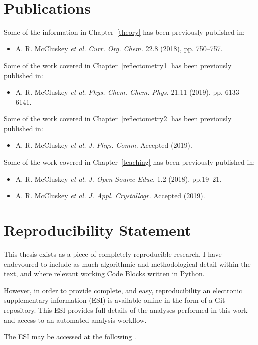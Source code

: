 \documentclass[twoside,symmetric,nobib]{./arm-thesis}
\newcommand{\blankpage}{\newpage\hbox{}\thispagestyle{empty}\newpage}
\begin{document}
\blankpage

\newpage
\begin{fullwidth}
\thispagestyle{empty}
\setlength{\parindent}{0pt}
\setlength{\parskip}{\baselineskip}
~\vfill

\chapter*{Publications}
Some of the information in Chapter~\ref{theory} has been previously published in:
\begin{itemize}
  \item A. R. McCluskey \emph{et al.} \emph{Curr. Org. Chem.} 22.8 (2018), pp. 750–757.
\end{itemize}
Some of the work covered in Chapter~\ref{reflectometry1} has been previously published in:
\begin{itemize}
  \item A. R. McCluskey \emph{et al.} \emph{Phys. Chem. Chem. Phys.} 21.11 (2019), pp. 6133–6141.
\end{itemize}
Some of the work covered in Chapter~\ref{reflectometry2} has been previously published in:
\begin{itemize}
  \item A. R. McCluskey \emph{et al.} \emph{J. Phys. Comm.} Accepted (2019).
\end{itemize}
Some of the work covered in Chapter~\ref{teaching} has been previously published in:
\begin{itemize}
  \item A. R. McCluskey \emph{et al.} \emph{J. Open Source Educ.} 1.2 (2018), pp.19–21.
  \item A. R. McCluskey \emph{et al.} \emph{J. Appl. Crystallogr.} Accepted (2019).
\end{itemize}

\chapter*{Reproducibility Statement}
This thesis exists as a piece of completely reproducible research.
I have endevoured to include as much algorithmic and methodological detail within the text, and where relevant working Code Blocks written in Python.

However, in order to provide complete, and easy, reproducibility an electronic supplementary information (ESI) is available online in the form of a Git repository.
This ESI provides full details of the analyses performed in this work and access to an automated analysis workflow.

The ESI may be accessed at the following .

~\vfill
\end{fullwidth}
\end{document}
